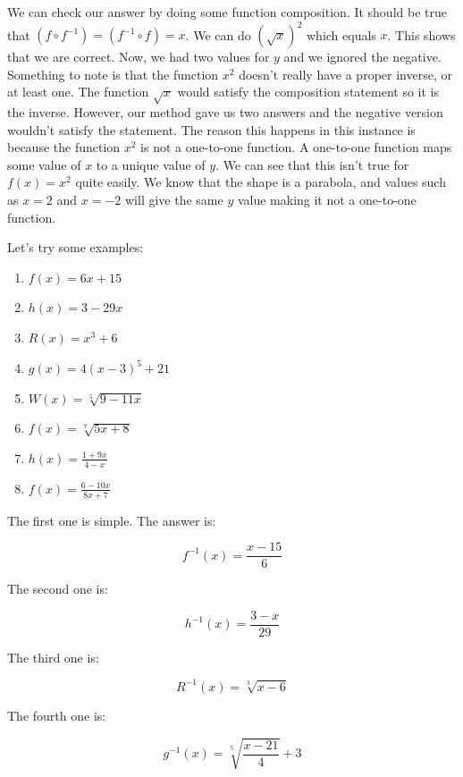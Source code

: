 \documentclass[12pt]{article}
\begin{document}
We can check our answer by doing some function composition.
It should be true that $(f \circ f^{-1}) = (f^{-1} \circ f) = x$.
We can do $(\sqrt{x})^2$ which equals $x$.
This shows that we are correct.
Now, we had two values for $y$ and we ignored the negative.
Something to note is that the function $x^2$ doesn't really have a proper inverse, or at least one.
The function $\sqrt{x}$ would satisfy the composition statement so it is the inverse.
However, our method gave us two answers and the negative version wouldn't satisfy the statement.
The reason this happens in this instance is because the function $x^2$ is not a one-to-one function.
A one-to-one function maps some value of $x$ to a unique value of $y$.
We can see that this isn't true for $f(x)=x^2$ quite easily.
We know that the shape is a parabola, and values such as $x=2$ and $x=-2$ will give the same $y$ value making it not a one-to-one function.


Let's try some examples:

\begin{enumerate}
    \item $f(x) = 6x + 15$
    \item $h(x) = 3 - 29x$
    \item $R(x) = x^3 + 6$
    \item $g(x) = 4(x-3)^5 + 21$
    \item $W(x) = \sqrt[5]{9-11x}$
    \item $f(x) = \sqrt[7]{5x+8}$
    \item $h(x) = \displaystyle \frac{1+9x}{4-x}$
    \item $f(x) = \displaystyle \frac{6-10x}{8x+7}$
\end{enumerate}

The first one is simple.
The answer is:

\begin{equation}
    f^{-1}(x) = \frac{x-15}{6}
\end{equation}

The second one is:

\begin{equation}
    h^{-1}(x) = \frac{3-x}{29}
\end{equation}

The third one is:

\begin{equation}
    R^{-1}(x) = \sqrt[3]{x-6}
\end{equation}

The fourth one is:

\begin{equation}
    g^{-1}(x) = \sqrt[5]{\frac{x-21}{4}}+3
\end{equation}
\end{document}
